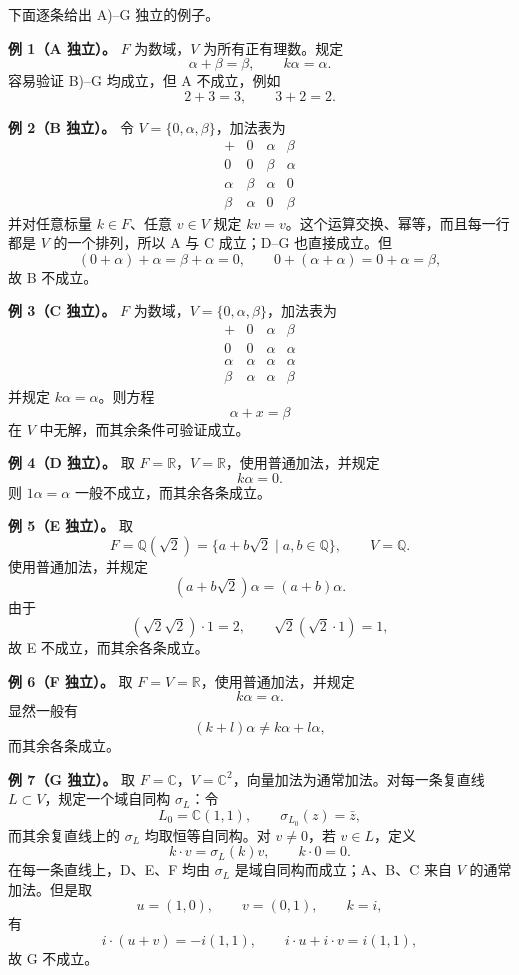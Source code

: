 下面逐条给出 A)--G 独立的例子。

\textbf{例 1（A 独立）。} $F$ 为数域，$V$ 为所有正有理数。规定
\[
\alpha+\beta=\beta,
\qquad
k\alpha=\alpha.
\]
容易验证 B)--G 均成立，但 A 不成立，例如
\[
2+3=3,
\qquad
3+2=2.
\]

\textbf{例 2（B 独立）。} 令 $V=\{0,\alpha,\beta\}$，加法表为
\[
\begin{array}{c|ccc}
+&0&\alpha&\beta\\\hline
0&0&\beta&\alpha\\
\alpha&\beta&\alpha&0\\
\beta&\alpha&0&\beta
\end{array}
\]
并对任意标量 $k\in F$、任意 $v\in V$ 规定 $kv=v$。这个运算交换、幂等，而且每一行都是 $V$ 的一个排列，所以 A 与 C 成立；D--G 也直接成立。但
\[
(0+\alpha)+\alpha=\beta+\alpha=0,
\qquad
0+(\alpha+\alpha)=0+\alpha=\beta,
\]
故 B 不成立。

\textbf{例 3（C 独立）。} $F$ 为数域，$V=\{0,\alpha,\beta\}$，加法表为
\[
\begin{array}{c|ccc}
+&0&\alpha&\beta\\\hline
0&0&\alpha&\alpha\\
\alpha&\alpha&\alpha&\alpha\\
\beta&\alpha&\alpha&\beta
\end{array}
\]
并规定 $k\alpha=\alpha$。则方程
\[
\alpha+x=\beta
\]
在 $V$ 中无解，而其余条件可验证成立。

\textbf{例 4（D 独立）。} 取 $F=\mathbb R$，$V=\mathbb R$，使用普通加法，并规定
\[
k\alpha=0.
\]
则 $1\alpha=\alpha$ 一般不成立，而其余各条成立。

\textbf{例 5（E 独立）。} 取
\[
F=\mathbb Q(\sqrt2)=\{a+b\sqrt2\mid a,b\in\mathbb Q\},
\qquad
V=\mathbb Q.
\]
使用普通加法，并规定
\[
(a+b\sqrt2)\alpha=(a+b)\alpha.
\]
由于
\[
(\sqrt2\sqrt2)\cdot1=2,
\qquad
\sqrt2(\sqrt2\cdot1)=1,
\]
故 E 不成立，而其余各条成立。

\textbf{例 6（F 独立）。} 取 $F=V=\mathbb R$，使用普通加法，并规定
\[
k\alpha=\alpha.
\]
显然一般有
\[
(k+l)\alpha\ne k\alpha+l\alpha,
\]
而其余各条成立。

\textbf{例 7（G 独立）。} 取 $F=\mathbb C$，$V=\mathbb C^2$，向量加法为通常加法。对每一条复直线 $L\subset V$，规定一个域自同构 $\sigma_L$：令
\[
L_0=\mathbb C(1,1),
\qquad
\sigma_{L_0}(z)=\bar z,
\]
而其余复直线上的 $\sigma_L$ 均取恒等自同构。对 $v\ne0$，若 $v\in L$，定义
\[
k\cdot v=\sigma_L(k)v,
\qquad  k\cdot0=0.
\]
在每一条直线上，D、E、F 均由 $\sigma_L$ 是域自同构而成立；A、B、C 来自 $V$ 的通常加法。但是取
\[
u=(1,0),\qquad v=(0,1),\qquad k=i,
\]
有
\[
i\cdot(u+v)=-i(1,1),
\qquad
 i\cdot u+i\cdot v=i(1,1),
\]
故 G 不成立。

